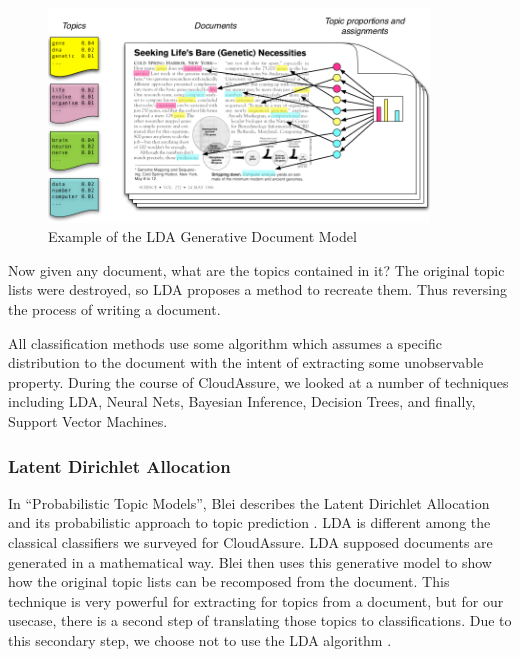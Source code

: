 \begin{figure}[h!]
    \begin{center}
        \includegraphics[width=0.90\textwidth]{Figures/LDA_Generation.png}
        \caption{Example of the LDA Generative Document Model}
        \label{fig:LDA_Generative_Model}
    \end{center}
\end{figure}
Now given any document, what are the topics contained in it? The original topic
lists were destroyed, so \gls{LDA} proposes a method to recreate them. Thus reversing
the process of writing a document.

All classification methods use some algorithm which assumes a specific
distribution to the document with the intent of extracting some unobservable
property. During the course of CloudAssure, we looked at a number of techniques
including \gls{LDA}, Neural Nets, Bayesian Inference, Decision Trees, and finally,
Support Vector Machines.

\subsubsection{Latent Dirichlet Allocation}
In ``Probabilistic Topic Models'', Blei describes the Latent Dirichlet
Allocation and its probabilistic approach to topic prediction
\autocite{Blei2012}. \gls{LDA} is different among the classical classifiers we
surveyed for CloudAssure. \gls{LDA} supposed documents are generated in
a mathematical way. Blei then uses this generative model to show how the original topic lists can be
recomposed from the document. This technique is very powerful for extracting for
topics from a document, but for our usecase, there is a second step of
translating those topics to classifications. Due to this secondary step, we
choose not to use the LDA algorithm \autocite{RadimRehurek2010}.

